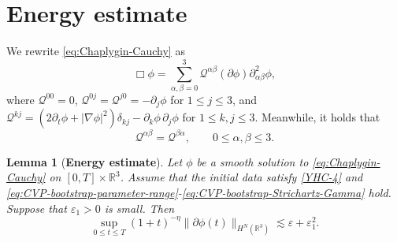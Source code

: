 \documentclass[11pt,twoside]{article}
\def\cQ{\mathcal Q}
\def\ve{\varepsilon}
\def\ls{\lesssim}
\theoremstyle{plain}
\newtheorem{lemma}[theorem]{Lemma}
\theoremstyle{definition}
\theoremstyle{assumption}
\numberwithin{equation}{section}
\begin{document}
	
	
	
	
	
	\section{Energy estimate}\label{sec:Chaplygin-energy-estimates}
	
	
	
	
	We rewrite 	\eqref{eq:Chaplygin-Cauchy}  as
	\begin{equation}\label{eq:Chaplygin-energy-reformulation}
		\Box\phi
		=\sum_{\alpha,\beta=0}^3
		\cQ^{\alpha\beta}(\partial\phi)
		\partial_{\alpha\beta}^2\phi,
	\end{equation}
	where $\cQ^{00}=0$, $\cQ^{0j}=\cQ^{j0}
		=-\partial_j\phi$ for $1\le j\le3$,
	and $\cQ^{kj}
		=\left(
		2\partial_t\phi+|\nabla\phi|^2
		\right)\delta_{kj}
		-\partial_k\phi\,\partial_j\phi$ for
		$1\le k,j\le3$.	
	Meanwhile, it holds that
	\begin{equation}\label{eq:Chaplygin-energy-symmetry}
		\cQ^{\alpha\beta}
		=
		\cQ^{\beta\alpha},
		\qquad
		0\le\alpha,\beta\le3.
	\end{equation}
	
	\begin{lemma}[{\bf Energy estimate}]\label{lem:Chaplygin-energy-estimate}
		Let \(\phi\) be a smooth solution to
		\eqref{eq:Chaplygin-Cauchy} on \([0,T]\times\mathbb R^3\).
		Assume that the initial data satisfy \eqref{YHC-4} and
		\eqref{eq:CVP-bootstrap-parameter-range}-\eqref{eq:CVP-bootstrap-Strichartz-Gamma}
		hold. Suppose that \(\ve_1>0\) is small. Then
		\begin{equation}\label{eq:Chaplygin-energy-growth-epsilon1}
			\sup_{0\le t\le T}(1+t)^{-\eta}\|\partial\phi(t)\|_{H^N(\mathbb R^3)}
			\ls
			\ve +\ve_1^2.
		\end{equation}
	\end{lemma}
	
\end{document}
